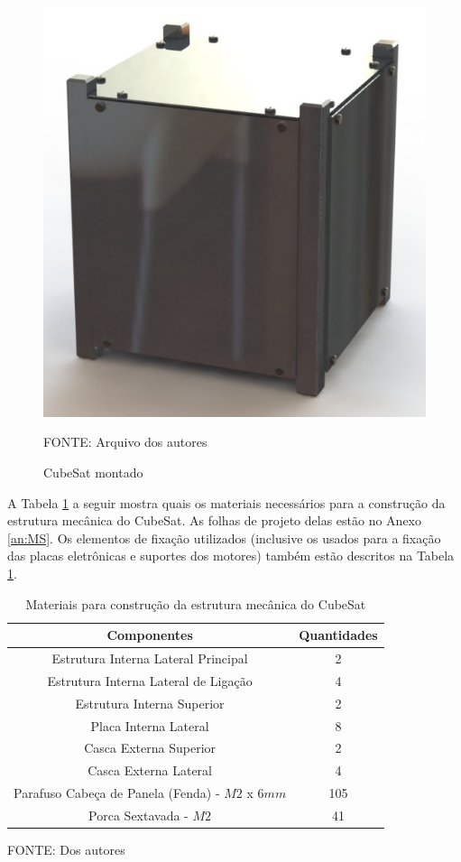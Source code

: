 \documentclass[
	12pt,				%
	openany,			%
	twoside,			%
	a4paper,			%
	english,			%
	french,				%
	spanish,			%
	brazil,				%
	oldfontcommands
	]{abntex2}
\begin{document}
\begin{figure}[th]
	\caption{CubeSat montado}
	\centering
	\includegraphics[width=0.7\linewidth]{./figs/Frame_Full}
	
	\begin{small}
		FONTE: Arquivo dos autores
	\end{small}
	\label{fig:FrameFull}
\end{figure}

\newpage

A Tabela \ref{tab:MatMec} a seguir mostra quais os materiais necessários para a construção da estrutura mecânica do CubeSat. As folhas de projeto delas estão no Anexo \ref{an:MS}. Os elementos de fixação utilizados (inclusive os usados para a fixação das placas eletrônicas e suportes dos motores) também estão descritos na Tabela \ref{tab:MatMec}.

\begin{table}[h]
	\caption{Materiais para construção da estrutura mecânica do CubeSat}
		\centering
	\begin{tabular}{|c|c|}
		\hline
		\textbf{Componentes} & \textbf{Quantidades} \\ 
		\hline 
		Estrutura Interna Lateral Principal & 2 \\ 
		\hline 
		Estrutura Interna Lateral de Ligação & 4 \\ 
		\hline 
		Estrutura Interna Superior & 2 \\
		\hline 
		Placa Interna Lateral & 8 \\
		\hline 
		Casca Externa Superior & 2 \\ 
		\hline 
		Casca Externa Lateral & 4 \\ 
		\hline 
		Parafuso Cabeça de Panela (Fenda) - $M2$ x $6mm$ & 105 \\
		\hline
		Porca Sextavada - $M2$ & 41 \\
		\hline
	\end{tabular}
	
	\begin{small}
	\vspace{3pt}	
	FONTE: Dos autores
	\end{small}
	\label{tab:MatMec}
\end{table}
\end{document}
